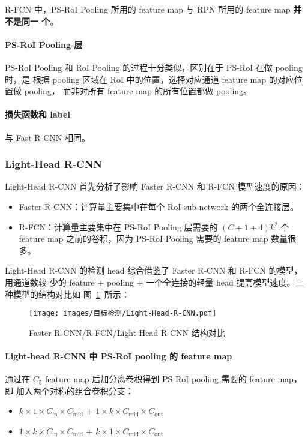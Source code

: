 R-FCN 中，PS-RoI Pooling 所用的 feature map 与 RPN 所用的 feature map \textbf{并不是同一
个}。

\paragraph{PS-RoI Pooling 层}
PS-RoI Pooling 和 RoI Pooling 的过程十分类似，区别在于 PS-RoI 在做 pooling 时，是
根据 pooling 区域在 RoI 中的位置，选择对应通道 feature map 的对应位置做 pooling，
而非对所有 feature map 的所有位置都做 pooling。

\paragraph{损失函数和 label}
与 \hyperref[subsec:Fast-R-CNN]{Fast R-CNN} 相同。

\subsubsection{Light-Head R-CNN}
Light-Head R-CNN 首先分析了影响 Faster R-CNN 和 R-FCN 模型速度的原因：

\begin{itemize}
  \item Faster R-CNN：计算量主要集中在每个 RoI sub-network 的两个全连接层。
  \item R-FCN：计算量主要集中在 PS-RoI Pooling 层需要的 $(C+1+4)k^2$ 个 feature
    map 之前的卷积，因为 PS-RoI Pooling 需要的 feature map 数量很多。
\end{itemize}

Light-Head R-CNN 的检测 head 综合借鉴了 Faster R-CNN 和 R-FCN 的模型，用通道数较
少的 feature + pooling + 一个全连接的轻量 head 提高模型速度。三种模型的结构对比如
图~\ref{fig:light-head}~所示：

\begin{figure}[ht]
  \centering
  \texttt{[image: images/目标检测/Light-Head-R-CNN.pdf]}
  \caption{Faster R-CNN/R-FCN/Light-Head R-CNN 结构对比}\label{fig:light-head}
\end{figure}

\paragraph{Light-head R-CNN 中 PS-RoI pooling 的 feature map}
通过在 $C_5$ feature map 后加分离卷积得到 PS-RoI pooling 需要的 feature map，即
加入两个对称的组合卷积分支：

\begin{itemize}
  \item $k \times 1 \times C_{\mathrm{in}} \times C_{\mathrm{mid}}$ + $1 \times k
    \times C_{\mathrm{mid}} \times C_{\mathrm{out}}$
  \item $1 \times k \times C_{\mathrm{in}} \times C_{\mathrm{mid}}$ + $k \times 1
    \times C_{\mathrm{mid}} \times C_{\mathrm{out}}$
\end{itemize}

